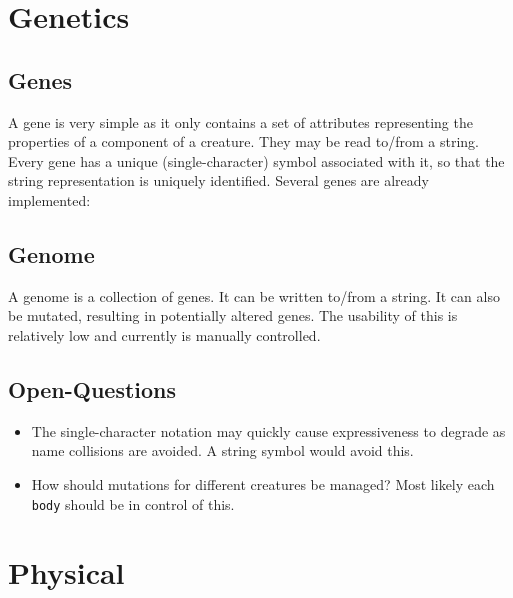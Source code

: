 \documentclass[../../main.tex]{subfiles}
\begin{document}
\section{Genetics}
	\subsection{Genes}
		A gene is very simple as it only contains a set of attributes representing the properties of a component of a creature. They may be read to/from a string. Every gene has a unique (single-character) symbol associated with it, so that the string representation is uniquely identified.
		Several genes are already implemented:
		\begin{center}
			\begin{minipage}{13cm}
			\end{minipage}
		\end{center}
	\subsection{Genome}
		A genome is a collection of genes. It can be written to/from a string. It can also be mutated, resulting in potentially altered genes. The usability of this is relatively low and currently is manually controlled.

	\subsection{Open-Questions}
		\begin{itemize}
			\item The single-character notation may quickly cause expressiveness to degrade as name collisions are avoided. A string symbol would avoid this.

			\item How should mutations for different creatures be managed? Most likely each \verb|body| should be in control of this.
		\end{itemize}

\section{Physical}
\end{document}
